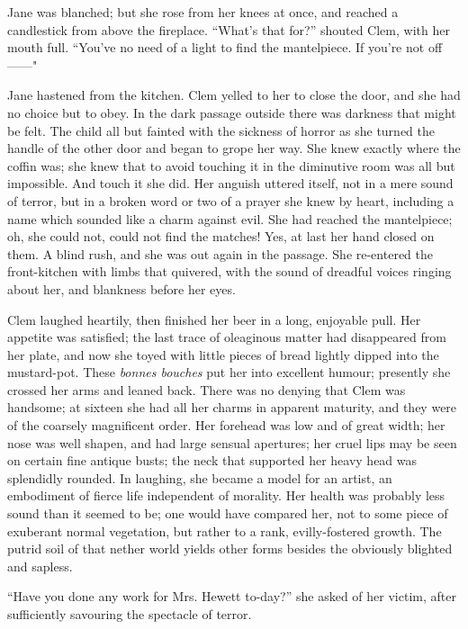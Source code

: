 Jane was blanched; but she rose from her knees at once, and reached a
candlestick from above the fireplace. ``What's that for?'' shouted Clem,
with her mouth full. ``You've no need of a light to find the
mantelpiece. If you're not off{{------}}"

Jane hastened from the kitchen. Clem yelled to her to close the door,
and she had no choice but to obey. In the dark passage outside there was
darkness that might be felt. The child all but fainted with the
{\protect\hypertarget{17}{}{}}sickness of horror as she turned the
handle of the other door and began to grope her way. She knew exactly
where the coffin was; she knew that to avoid touching it in the
diminutive room was all but impossible. And touch it she did. Her
anguish uttered itself, not in a mere sound of terror, but in a broken
word or two of a prayer she knew by heart, including a name which
sounded like a charm against evil. She had reached the mantelpiece; oh,
she could not, could not find the matches! Yes, at last her hand closed
on them. A blind rush, and she was out again in the passage. She
re-entered the front-kitchen with limbs that quivered, with the sound of
dreadful voices ringing about her, and blankness before her eyes.

Clem laughed heartily, then finished her beer in a long, enjoyable pull.
Her appetite was satisfied; the last trace of oleaginous matter had
disappeared from her plate, and now she toyed with little pieces of
bread lightly dipped into the mustard-pot. These
{\protect\hypertarget{18}{}{}}\emph{bonnes bouches} put her into
excellent humour; presently she crossed her arms and leaned back. There
was no denying that Clem was handsome; at sixteen she had all her charms
in apparent maturity, and they were of the coarsely magnificent order.
Her forehead was low and of great width; her nose was well shapen, and
had large sensual apertures; her cruel lips may be seen on certain fine
antique busts; the neck that supported her heavy head was splendidly
rounded. In laughing, she became a model for an artist, an embodiment of
fierce life independent of morality. Her health was probably less sound
than it seemed to be; one would have compared her, not to some piece of
exuberant normal vegetation, but rather to a rank, evilly-fostered
growth. The putrid soil of that nether world yields other forms besides
the obviously blighted and sapless.

``Have you done any work for Mrs. Hewett to-day?'' she asked of her
victim, after sufficiently savouring the spectacle of terror.

